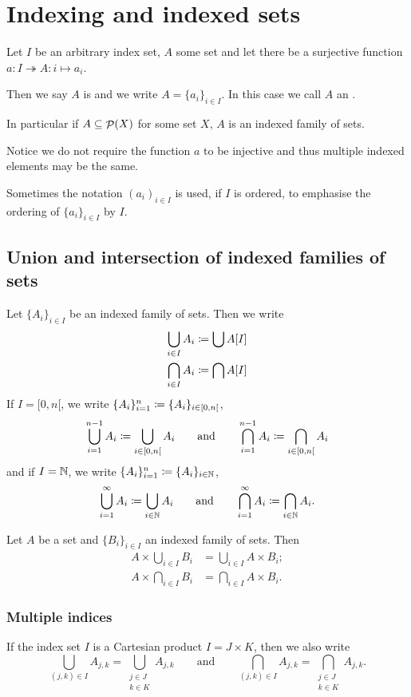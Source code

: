 \section{Indexing and indexed sets}
\begin{definition}
Let $I$ be an arbitrary index set, $A$ some set and let there be a surjective function $a: I\twoheadrightarrow A: i \mapsto a_i$.

Then we say $A$ is  and we write $A = \{a_i\}_{i\in I}$. In this case we call $A$ an .

In particular if $A\subseteq \mathop{\mathcal{P}}(X)$ for some set $X$, $A$ is an indexed family of sets.
\end{definition}
Notice we do not require the function $a$ to be injective and thus multiple indexed elements may be the same.

Sometimes the notation $(a_i)_{i\in I}$ is used, if $I$ is ordered, to emphasise the ordering of $\{a_i\}_{i\in I}$ by $I$.

\subsection{Union and intersection of indexed families of sets}
Let $\{A_i\}_{i\in I}$ be an indexed family of sets. Then we write
\begin{align*}
\bigcup_{i\in I} A_i &\coloneqq \bigcup A[I] \\
\bigcap_{i\in I} A_i &\coloneqq \bigcap A[I]
\end{align*}
If $I = [0,n[$, we write $\{A_i\}_{i=1}^{n} \coloneqq \{A_i\}_{i\in [0,n[}$,
\[ \bigcup_{i=1}^{n-1} A_i \coloneqq \bigcup_{i\in [0,n[} A_i \qquad \text{and} \qquad \bigcap_{i=1}^{n-1} A_i \coloneqq \bigcap_{i\in [0,n[} A_i \]
and if $I=\mathbb{N}$, we write $\{A_i\}_{i=1}^{n} \coloneqq \{A_i\}_{i\in \mathbb{N}}$,
\[ \bigcup_{i=1}^{\infty} A_i \coloneqq \bigcup_{i\in \mathbb{N}} A_i \qquad \text{and} \qquad \bigcap_{i=1}^{\infty} A_i \coloneqq \bigcap_{i\in \mathbb{N}} A_i. \]

\begin{lemma}
Let $A$ be a set and $\{B_i\}_{i\in I}$ an indexed family of sets. Then
\begin{align*}
A\times \bigcup_{i\in I} B_i &= \bigcup_{i\in I}A\times B_i; \\
A\times \bigcap_{i\in I} B_i &= \bigcap_{i\in I}A\times B_i.
\end{align*}
\end{lemma}

\subsubsection{Multiple indices}
If the index set $I$ is a Cartesian product $I=J\times K$, then we also write
\[ \bigcup_{(j,k)\in I} A_{j,k} = \bigcup_{\substack{j\in J \\ k\in K}} A_{j,k} \qquad\text{and}\qquad \bigcap_{(j,k)\in I} A_{j,k} = \bigcap_{\substack{j\in J \\ k\in K}} A_{j,k}. \]


